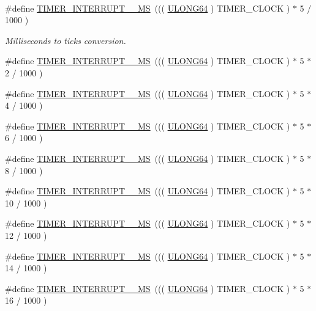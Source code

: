 \paragraph*{}
\begin{DoxyCompactItemize}
\item 
\#define \hyperlink{a00673_ga85adb3cf09e71797fa296930193832b4}{TIMER\_\-INTERRUPT\_\_\-MS}~((( \hyperlink{a00660_ga28961430434ccabca6862ea93fe9a15b}{ULONG64} ) TIMER\_\-CLOCK ) $\ast$ 5 / 1000 )
\begin{DoxyCompactList}\small\item\em Milliseconds to ticks conversion. \end{DoxyCompactList}\item 
\#define \hyperlink{a00673_ga15be38412cbf707fb1713528a5f5e6b3}{TIMER\_\-INTERRUPT\_\_\-MS}~((( \hyperlink{a00660_ga28961430434ccabca6862ea93fe9a15b}{ULONG64} ) TIMER\_\-CLOCK ) $\ast$ 5 $\ast$ 2 / 1000 )
\item 
\#define \hyperlink{a00673_ga0680372985c2ad123fd4e1984f1ff9a1}{TIMER\_\-INTERRUPT\_\_\-MS}~((( \hyperlink{a00660_ga28961430434ccabca6862ea93fe9a15b}{ULONG64} ) TIMER\_\-CLOCK ) $\ast$ 5 $\ast$ 4 / 1000 )
\item 
\#define \hyperlink{a00673_gac9f2593e6b663668cd0d1420e4a5f609}{TIMER\_\-INTERRUPT\_\_\-MS}~((( \hyperlink{a00660_ga28961430434ccabca6862ea93fe9a15b}{ULONG64} ) TIMER\_\-CLOCK ) $\ast$ 5 $\ast$ 6 / 1000 )
\item 
\#define \hyperlink{a00673_ga13b2586797ac950024aa46134ba569ab}{TIMER\_\-INTERRUPT\_\_\-MS}~((( \hyperlink{a00660_ga28961430434ccabca6862ea93fe9a15b}{ULONG64} ) TIMER\_\-CLOCK ) $\ast$ 5 $\ast$ 8 / 1000 )
\item 
\#define \hyperlink{a00673_gac0bd52bbc8f9d73f2e518d376e775d03}{TIMER\_\-INTERRUPT\_\_\-MS}~((( \hyperlink{a00660_ga28961430434ccabca6862ea93fe9a15b}{ULONG64} ) TIMER\_\-CLOCK ) $\ast$ 5 $\ast$ 10 / 1000 )
\item 
\#define \hyperlink{a00673_ga05c2fdd777df5b88de99e08ab97b882b}{TIMER\_\-INTERRUPT\_\_\-MS}~((( \hyperlink{a00660_ga28961430434ccabca6862ea93fe9a15b}{ULONG64} ) TIMER\_\-CLOCK ) $\ast$ 5 $\ast$ 12 / 1000 )
\item 
\#define \hyperlink{a00673_ga2e708b60d3621f4c13bcd07001696d57}{TIMER\_\-INTERRUPT\_\_\-MS}~((( \hyperlink{a00660_ga28961430434ccabca6862ea93fe9a15b}{ULONG64} ) TIMER\_\-CLOCK ) $\ast$ 5 $\ast$ 14 / 1000 )
\item 
\#define \hyperlink{a00673_ga363db70188865e3d222337dfd68cd5f1}{TIMER\_\-INTERRUPT\_\_\-MS}~((( \hyperlink{a00660_ga28961430434ccabca6862ea93fe9a15b}{ULONG64} ) TIMER\_\-CLOCK ) $\ast$ 5 $\ast$ 16 / 1000 )

\end{DoxyCompactItemize}
